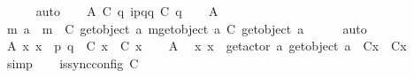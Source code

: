 \begin{isabellebody}
\ \ \ \ \isamarkupfalse%
\ auto\isanewline
\ \ \isamarkupfalse%
\ A{}{\isacharcolon}{\kern0pt}\ {\isachardoublequoteopen}C{}\ q\ {\isasymmidarrow}{\isacharquery}{\kern0pt}{\isasymlangle}{\isacharparenleft}{\kern0pt}i\isactrlbsup p{\isasymrightarrow}q\isactrlesup {\isacharparenright}{\kern0pt}{\isasymrangle}{\isasymrightarrow}q\ {\isacharparenleft}{\kern0pt}C{}\ q{\isacharparenright}{\kern0pt}{\isachardoublequoteclose}\isanewline
\ \ \isamarkupfalse%
\ A{}\ \isamarkupfalse%
\ {\isachardoublequoteopen}{\isasymexists}m{\isachardot}{\kern0pt}\ a\ {\isacharequal}{\kern0pt}\ {\isacharbang}{\kern0pt}{\isasymlangle}m{\isasymrangle}\ {\isasymand}\ C{}\ {\isacharparenleft}{\kern0pt}get{\isacharunderscore}{\kern0pt}object\ a{\isacharparenright}{\kern0pt}\ {\isasymmidarrow}{\isacharquery}{\kern0pt}{\isasymlangle}m{\isasymrangle}{\isasymrightarrow}{\isacharparenleft}{\kern0pt}get{\isacharunderscore}{\kern0pt}object\ a{\isacharparenright}{\kern0pt}\ {\isacharparenleft}{\kern0pt}C{}\ {\isacharparenleft}{\kern0pt}get{\isacharunderscore}{\kern0pt}object\ a{\isacharparenright}{\kern0pt}{\isacharparenright}{\kern0pt}{\isachardoublequoteclose}\isanewline
\ \ \ \ \isamarkupfalse%
\ auto\isanewline
\ \ \isamarkupfalse%
\ A{}{\isacharcolon}{\kern0pt}\ {\isachardoublequoteopen}{\isasymforall}x{\isachardot}{\kern0pt}\ x\ {\isasymnotin}\ {\isacharbraceleft}{\kern0pt}p{\isacharcomma}{\kern0pt}\ q{\isacharbraceright}{\kern0pt}\ {\isasymlongrightarrow}\ C{}\ x\ {\isacharequal}{\kern0pt}\ C{}\ x{\isachardoublequoteclose}\isanewline
\ \ \isamarkupfalse%
\ A{}\ \isamarkupfalse%
\ {\isachardoublequoteopen}{\isasymforall}x{\isachardot}{\kern0pt}\ x\ {\isasymnotin}\ {\isacharbraceleft}{\kern0pt}get{\isacharunderscore}{\kern0pt}actor\ a{\isacharcomma}{\kern0pt}\ get{\isacharunderscore}{\kern0pt}object\ a{\isacharbraceright}{\kern0pt}\ {\isasymlongrightarrow}\ C{}{\isacharparenleft}{\kern0pt}x{\isacharparenright}{\kern0pt}\ {\isacharequal}{\kern0pt}\ C{}{\isacharparenleft}{\kern0pt}x{\isacharparenright}{\kern0pt}{\isachardoublequoteclose}\isanewline
\ \ \ \ \isamarkupfalse%
\ simp\isanewline
\ \ \isamarkupfalse%
\ {\isachardoublequoteopen}is{\isacharunderscore}{\kern0pt}sync{\isacharunderscore}{\kern0pt}config\ C{}{\isachardoublequoteclose}\isanewline

\end{isabellebody}

